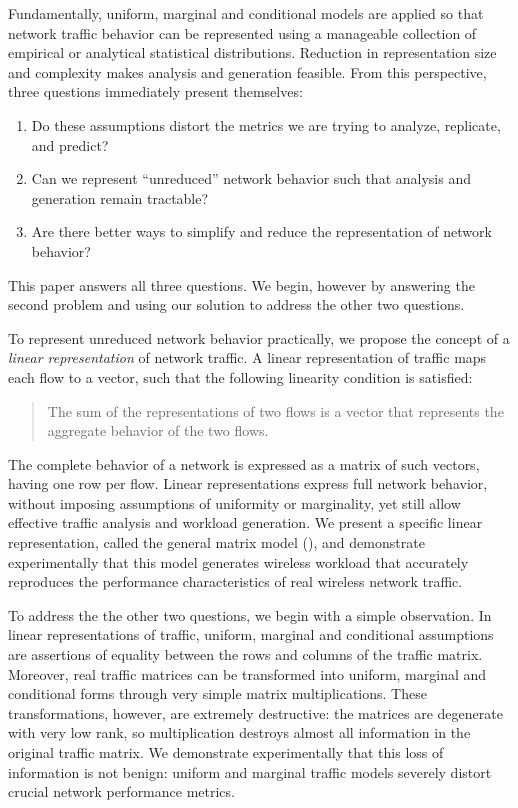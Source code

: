 \documentclass[twocolumn,final]{svjour3}
\begin{document}
Fundamentally, uniform, marginal and conditional models are applied so that network traffic behavior can be represented using a manageable collection of empirical or analytical statistical distributions.
Reduction in representation size and complexity makes analysis and generation feasible.
From this perspective, three questions immediately present themselves:
\begin{enumerate}
\item Do these assumptions distort the metrics we are trying to analyze, replicate, and predict?
\item Can we represent ``unreduced'' network behavior such that analysis and generation remain tractable?
\item Are there better ways to simplify and reduce the representation of network behavior?
\end{enumerate}
This paper answers all three questions. We begin, however by answering the second problem and  
using our solution to address the other two questions.

To represent unreduced network behavior practically, we propose the concept of a \emph{linear representation} of network traffic.
A linear representation of traffic maps each flow to a vector, such that the following linearity condition is satisfied:
\begin{quote}
The sum of the representations of two flows is a vector that represents the aggregate behavior of the two flows.
\end{quote}
The complete behavior of a network is expressed as a matrix of such vectors, having one row per flow.
Linear representations express full network behavior, without imposing assumptions of uniformity or marginality, yet still allow effective traffic analysis and workload generation.
We present a specific linear representation, called the general matrix model (), and demonstrate experimentally that this model generates wireless workload that accurately reproduces the performance characteristics of real wireless network traffic.


To address the the other two questions, we begin with a simple observation.
In linear representations of traffic, uniform, marginal and conditional assumptions are assertions of equality between the rows and columns of the traffic matrix.
Moreover, real traffic matrices can be transformed into uniform, marginal and conditional forms through very simple matrix multiplications.
These transformations, however, are extremely destructive: the matrices are degenerate with very low rank, so multiplication destroys almost all information in the original traffic matrix.
We demonstrate experimentally that this loss of information is not benign:
uniform and marginal traffic models severely distort crucial network performance metrics.
\end{document}
